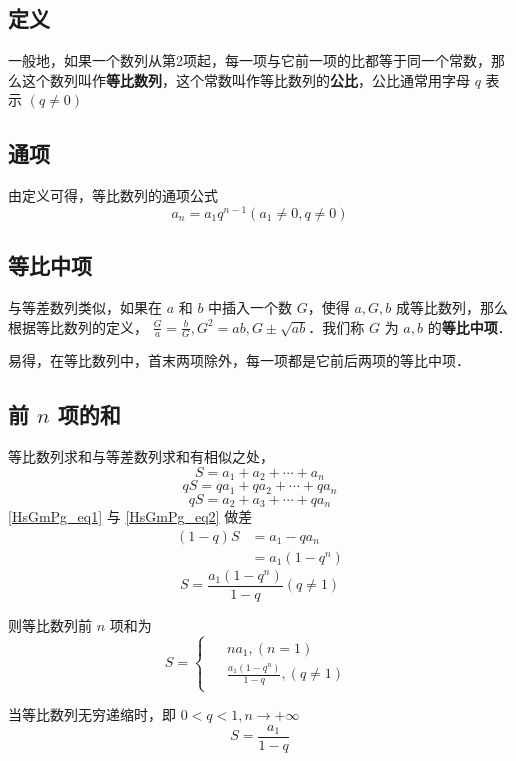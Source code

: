 
\begin{issues}
\issueDraft
\end{issues}

\subsection{定义}
一般地，如果一个数列从第2项起，每一项与它前一项的比都等于同一个常数，那么这个数列叫作\textbf{等比数列}，这个常数叫作等比数列的\textbf{公比}，公比通常用字母 $q$ 表示 $(q\ne 0)$

\subsection{通项}
由定义可得，等比数列的通项公式
\begin{equation}
a_n = a_1 q^{n-1}(a_1 \ne 0,q\ne 0)
\end{equation}

\subsection{等比中项}
与等差数列类似，如果在 $a$ 和 $b$ 中插入一个数 $G$，使得 $a,G,b$ 成等比数列，那么根据等比数列的定义， $\frac{G}{a} = \frac{b}{G},G^2 = ab,G \pm \sqrt{ab}$．我们称 $G$ 为 $a,b$ 的\textbf{等比中项}．

易得，在等比数列中，首末两项除外，每一项都是它前后两项的等比中项．

\subsection{前 $n$ 项的和}
等比数列求和与等差数列求和有相似之处，
\begin{equation}\label{HsGmPg_eq1}
S = a_1 + a_2 + \cdots + a_n
\end{equation}
\begin{equation}
qS = qa_1 + qa_2 + \cdots + qa_n
\end{equation}
\begin{equation}\label{HsGmPg_eq2}
qS= a_2 + a_3 + \cdots + qa_n
\end{equation}
\autoref{HsGmPg_eq1} 与 \autoref{HsGmPg_eq2} 做差
\begin{equation}
\begin{aligned}
(1 - q)S &= a_1 - qa_n\\
&= a_1(1 - q^n)
\end{aligned}
\end{equation}
\begin{equation}
S = \frac{a_1(1-q^n)}{1-q}(q\neq 1)
\end{equation}

则等比数列前 $n$ 项和为
\begin{equation}
S = 
\begin{cases}
\begin{aligned}
&na_1,(n = 1) \\
&\frac{a_1(1-q^n)}{1-q},(q \neq 1)
\end{aligned}
\end{cases}
\end{equation}

当等比数列无穷递缩时，即 $0<q<1,n\rightarrow +\infty$
\begin{equation}
S = \frac{a_1}{1 - q}
\end{equation}